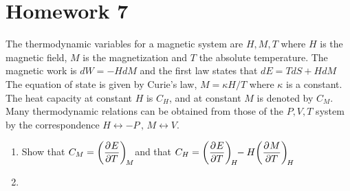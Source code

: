 \documentclass{article}
\begin{document}
\section{Homework 7}
\begin{problem}[Reif 5.26]
    
\end{problem}
\begin{problem}
    The thermodynamic variables for a magnetic system are $H,M,T$ where $H$ is the magnetic field, $M$ is the magnetization and $T$ the absolute temperature. The magnetic work is $dW = -HdM$ and the first law
    states that $dE=TdS+HdM$ The equation of state is given by Curie's law, $M=\kappa H/T$ where $\kappa$ is a constant. The heat capacity at constant $H$ is $C_H$, and at constant $M$ is denoted by $C_M$. Many
    thermodynamic relations can be obtained from those of the $P,V,T$ system by the correspondence $H \leftrightarrow -P\,,\, M\leftrightarrow V$.
    \begin{enumerate}[label=(\alph*)]
        \item Show that $\displaystyle C_M=\pder{E}{T}[M]$ and that $\displaystyle C_H=\pder{E}{T}[H]-H\pder{M}{T}[H]$
        \item 
    \end{enumerate}
\end{problem}
    
\end{document}

